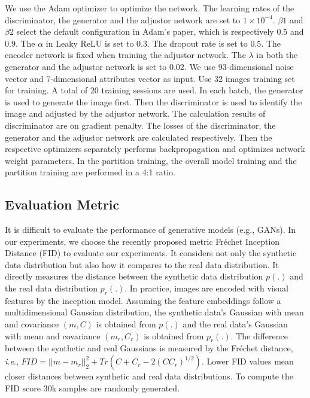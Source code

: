 We use the Adam optimizer to optimize the network.
The learning rates of the discriminator, the generator and the adjustor network are set to $1\times10^{-4}$.
$\beta1$ and $\beta2$ select the default configuration in Adam's paper, which is respectively 0.5 and 0.9.
The $\alpha$ in Leaky ReLU is set to $0.3$.
The dropout rate is set to $0.5$.
The encoder network is fixed when training the adjustor network.
The $\lambda$ in both the generator and the adjustor network is set to 0.02.
We use 93-dimensional noise vector and 7-dimensional attributes vector as input.
Use 32 images training set for training.
A total of 20 training sessions are used.
In each batch, the generator is used to generate the image first.
Then the discriminator is used to identify the image and adjusted by the adjustor network.
The calculation results of discriminator are on gradient penalty.
The losses of the discriminator, the generator and the adjustor network are calculated respectively.
Then the respective optimizers separately performs backpropagation and optimizes network weight parameters.
In the partition training, the overall model training and the partition training are performed in a 4:1 ratio.

\subsection{Evaluation Metric}
It is difficult to evaluate the performance of generative models (e.g., GANs).
In our experiments, we choose the recently proposed metric Fr\'echet Inception Distance (FID) to evaluate our experiments.
It considers not only the synthetic data distribution but also how it compares to the real data distribution.
It directly measures the distance between the synthetic data distribution $p(.)$ and the real data distribution $p_r(.)$.
In practice, images are encoded with visual features by the inception model.
Assuming the feature embeddings follow a multidimensional Gaussian distribution,
    the synthetic data's Gaussian with mean and covariance $(m, C)$ is obtained from $p(.)$ and the real data's Gaussian with mean and covariance $(m_r, C_r)$ is obtained from $p_r(.)$.
The difference between the synthetic and real Gaussians is measured by the Fr\'echet distance, \emph{i.e}.,
    $FID = ||m-m_r||_{2}^{2} + Tr\left(C + C_r - 2(CC_r)^{1/2}\right)$.
Lower FID values mean closer distances between synthetic and real data distributions.
To compute the FID score 30k samples are randomly generated.


